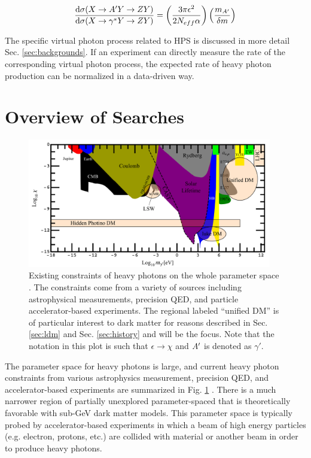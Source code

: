 \begin{equation}
    \frac{\mathrm{d}\sigma(X \rightarrow A^\prime Y \rightarrow ZY)}{\mathrm{d}\sigma(X \rightarrow \gamma^* Y \rightarrow ZY)} = \left( \frac{3\pi \epsilon^2}{2 N_{eff}\alpha} \right) \left( \frac{m_{A^\prime}}{\delta m} \right)
    \label{eqn:radiatives}
\end{equation}

The specific virtual photon process related to HPS is discussed in more detail Sec. \ref{sec:backgrounds}. If an experiment can directly measure the rate of the corresponding virtual photon process, the expected rate of heavy photon production can be normalized in a data-driven way. 

\clearpage

\section{Overview of Searches}\label{sec:searches}

 \begin{figure}
    \centering
    \includegraphics[width=0.95\textwidth]{figs/motivation/constraints.png}
    \caption{Existing constraints of heavy photons on the whole parameter space \cite{Jaeckel_2010}. The constraints come from a variety of sources including astrophysical measurements, precision QED, and particle accelerator-based experiments. The regional labeled ``unified DM'' is of particular interest to dark matter for reasons described in Sec. \ref{sec:ldm} and Sec. \ref{sec:history} and will be the focus. Note that the notation in this plot is such that $\epsilon \rightarrow \chi$ and $A^\prime$ is denoted as $\gamma'$.}
    \label{fig:constraints}
\end{figure}

The parameter space for heavy photons is large, and current heavy photon constraints from various astrophysics measurement, precision QED, and accelerator-based experiments are summarized in Fig. \ref{fig:constraints} \cite{Jaeckel_2010}. There is a much narrower region of partially unexplored parameter-spaced that is theoretically favorable with sub-GeV dark matter models. This parameter space is typically probed by accelerator-based experiments in which a beam of high energy particles (e.g. electron, protons, etc.) are collided with material or another beam in order to produce heavy photons.


